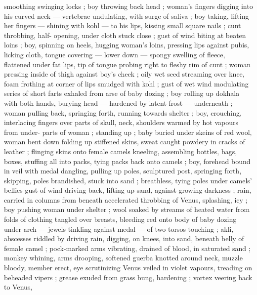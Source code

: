 smoothing swinging locks ; boy throwing back head ; woman's 
fingers digging into his curved neck --- vertebrae undulating, with 
surge of saliva ; boy taking, lifting her fingers --- shining with kohl 
--- to his lips, kissing small square nails ; cunt throbbing, half- 
opening, under cloth stuck close ; gust of wind biting at beaten loins 
; boy, spinning on heels, hugging woman's loins, pressing lips 
against pubis, licking cloth, tongue covering --- lower down --- 
spongy swelling of fleece, flattened under fat lips, tip of tongue 
probing right to fleshy rim of cunt ; woman pressing inside of thigh 
against boy's cheek ; oily wet seed streaming over knee, foam 
frothing at corner of lips smudged with kohl ; gust of wet wind 
modulating series of short farts exhaled from arse of baby dozing ; 
boy rolling up dokhala with both hands, burying head --- hardened 
by latent frost --- underneath ; woman pulling back, springing forth, 
running towards shelter ; boy, crouching, interlacing fingers over 
parts of skull, neck, shoulders warmed by hot vapours from under- 
parts of woman ; standing up ; baby buried under skeins of red wool, 
woman bent down folding up stiffened skins, sweat caught powdery 
in cracks of leather ; flinging skins onto female camels kneeling, 
assembling bottles, bags, boxes, stuffing all into packs, tying packs 
back onto camels ; boy, forehead bound in veil with medal dangling, 
pulling up poles, sculptured post, springing forth, skipping, poles 
brandished, stuck into sand ; breathless, tying poles under camels' 
bellies {\col} gust of wind driving back, lifting up sand, against growing 
darkness ; rain, carried in columns from beneath accelerated 
throbbing of Venus, splashing, icy ; boy pushing woman under 
shelter ; wool soaked by streams of heated water from folds of 
clothing tangled over breasts, bleeding red onto body of baby 
dozing under arch --- jewels tinkling against medal --- of two torsos 
touching ; akli, abscesses riddled by driving rain, digging, on knees, 
into sand, beneath belly of female camel ; pock-marked arms 
vibrating, drained of blood, in saturated sand ; monkey whining, 
arms drooping, softened guerba knotted around neck, muzzle bloody, member erect, eye scrutinizing Venus veiled in violet vapours, treading on beheaded vipers ; grease exuded from grass bung, hardening ; vortex veering back to Venus, 

